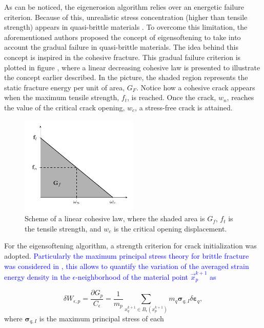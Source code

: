 \message{ !name(2020_EFM_MPM_Eigensoftening.tex)}\documentclass[preprint,12pt,a4paper]{elsarticle}
\newcommand{\tens}[1]{
  \ensuremath{\mathbf{{#1}}}
}
\newcommand{\MMP}[1]{
  \textcolor{blue}{{#1}}
}
\begin{document}
As can be noticed, the eigenerosion algorithm relies over an energetic
failure criterion. Because of this, unrealistic stress
concentration (higher than tensile strength) appears in quasi-brittle
materials \cite{Navas_2017_ES}. To overcome this limitation, the
aforementioned authors proposed the concept of eigensoftening to take
into account the gradual failure in quasi-brittle materials. The idea
behind this concept is inspired in the cohesive fracture. This gradual
failure criterion is plotted in figure \label{fig:Damage-ft-wc}, where
a linear decreasing cohesive law is presented to illustrate the
concept earlier described. In the picture, the shaded region represents
the static fracture energy per unit of area, $G_F$. Notice how a
cohesive crack appears when the maximum tensile strength, $f_t$, is
reached. Once the crack, $w_n$, reaches the value of the critical
crack opening, $w_c$, a stress-free crack is attained.
\begin{figure}
  \centering
  \includegraphics[width=0.5\textwidth]{Figure-Damage}
  \caption{Scheme of a linear cohesive law, where the shaded area is
    $G_f$, $f_t$ is the tensile strength, and $w_c$ is the critical
    opening displacement.}
  \label{fig:Damage-ft-wc}
\end{figure}
For the eigensoftening algorithm, a strength criterion for crack
initialization was adopted. \MMP{Particularly the maximum principal stress
theory for brittle fracture was considered in \cite{Navas_2017_ES},
this allows to quantify the variation of the averaged strain energy density in the
$\epsilon$-neighborhood of the material point $\vec{x}_p^{k+1}$ as}
\begin{equation}
  \label{eq:variation-averaged-strain-energy-density}
  \delta W_{\epsilon,p} = \frac{\partial G_p}{C_{\epsilon}} =
  \frac{1}{m_p} \sum_{x_q^{k+1} \in
  B_{\epsilon}(x_p^{k+1})} m_q \tens{\sigma}_{q,I} \delta \tens{\varepsilon}_q,
\end{equation}
where $\tens{\sigma}_{q,I}$ is the maximum principal stress of each
\end{document}
